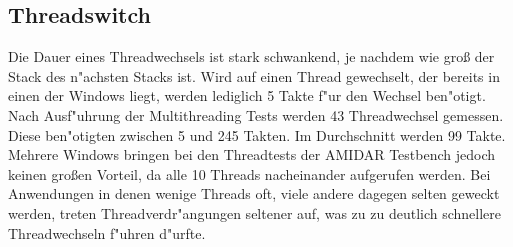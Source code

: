 \subsection{Threadswitch}
Die Dauer eines Threadwechsels ist stark schwankend, je nachdem wie groß der Stack des n"achsten Stacks ist. Wird auf einen Thread gewechselt, der bereits in einen der Windows liegt, werden lediglich 5 Takte f"ur den Wechsel ben"otigt. Nach Ausf"uhrung der Multithreading Tests werden 43 Threadwechsel gemessen. Diese ben"otigten zwischen 5 und 245 Takten. Im Durchschnitt werden 99 Takte. Mehrere Windows bringen bei den Threadtests der AMIDAR Testbench jedoch keinen großen Vorteil, da alle 10 Threads nacheinander aufgerufen werden. Bei Anwendungen in denen wenige Threads oft, viele andere dagegen selten geweckt werden, treten Threadverdr"angungen seltener auf, was zu zu deutlich schnellere Threadwechseln f"uhren d"urfte. 

